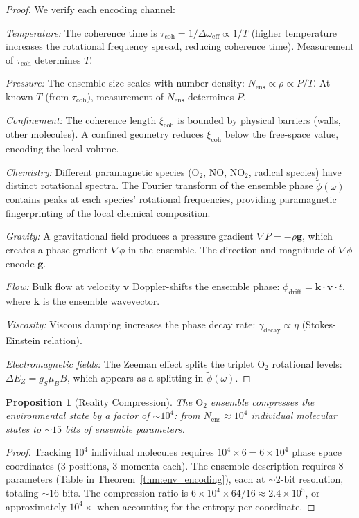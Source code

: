 \documentclass[twocolumn,10pt]{article}
\newtheorem{proposition}[theorem]{Proposition}
\theoremstyle{definition}
\theoremstyle{remark}
\newcommand{\xicoh}{\xi_{\mathrm{coh}}}
\newcommand{\Nens}{N_{\mathrm{ens}}}
\begin{document}
\begin{proof}
We verify each encoding channel:

\emph{Temperature:} The coherence time is $\tau_{\mathrm{coh}} = 1/\Delta\omega_{\mathrm{eff}} \propto 1/T$ (higher temperature increases the rotational frequency spread, reducing coherence time). Measurement of $\tau_{\mathrm{coh}}$ determines $T$.

\emph{Pressure:} The ensemble size scales with number density: $\Nens \propto \rho \propto P/T$. At known $T$ (from $\tau_{\mathrm{coh}}$), measurement of $\Nens$ determines $P$.

\emph{Confinement:} The coherence length $\xicoh$ is bounded by physical barriers (walls, other molecules). A confined geometry reduces $\xicoh$ below the free-space value, encoding the local volume.

\emph{Chemistry:} Different paramagnetic species ($\mathrm{O}_2$, NO, $\mathrm{NO}_2$, radical species) have distinct rotational spectra. The Fourier transform of the ensemble phase $\tilde{\phi}(\omega)$ contains peaks at each species' rotational frequencies, providing paramagnetic fingerprinting of the local chemical composition.

\emph{Gravity:} A gravitational field produces a pressure gradient $\nabla P = -\rho \mathbf{g}$, which creates a phase gradient $\nabla\phi$ in the ensemble. The direction and magnitude of $\nabla\phi$ encode $\mathbf{g}$.

\emph{Flow:} Bulk flow at velocity $\mathbf{v}$ Doppler-shifts the ensemble phase: $\phi_{\mathrm{drift}} = \mathbf{k} \cdot \mathbf{v} \cdot t$, where $\mathbf{k}$ is the ensemble wavevector.

\emph{Viscosity:} Viscous damping increases the phase decay rate: $\gamma_{\mathrm{decay}} \propto \eta$ (Stokes-Einstein relation).

\emph{Electromagnetic fields:} The Zeeman effect splits the triplet $\mathrm{O}_2$ rotational levels: $\Delta E_Z = g_S \mu_B B$, which appears as a splitting in $\tilde{\phi}(\omega)$.
\end{proof}

\begin{proposition}[Reality Compression]
\label{prop:compression}
The $\mathrm{O}_2$ ensemble compresses the environmental state by a factor of $\sim 10^4$: from $\Nens \approx 10^4$ individual molecular states to $\sim 15$ bits of ensemble parameters.
\end{proposition}

\begin{proof}
Tracking $10^4$ individual molecules requires $10^4 \times 6 = 6 \times 10^4$ phase space coordinates (3 positions, 3 momenta each). The ensemble description requires 8 parameters (Table in Theorem~\ref{thm:env_encoding}), each at $\sim 2$-bit resolution, totaling $\sim 16$ bits. The compression ratio is $6 \times 10^4 \times 64 / 16 \approx 2.4 \times 10^5$, or approximately $10^4 \times$ when accounting for the entropy per coordinate.
\end{proof}
\end{document}
